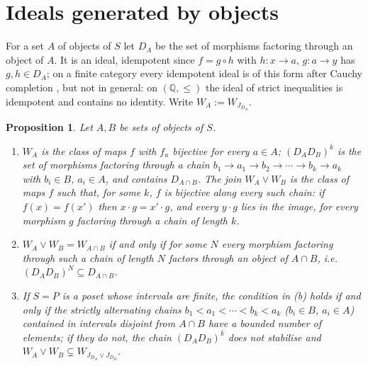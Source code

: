 \documentclass[11pt]{amsart}
\newtheorem{prop}[thm]{Proposition}
\theoremstyle{definition}
\begin{document}
\section{Ideals generated by objects}\label{sec:objects}

For a set $A$ of objects of $S$ let $D_A$ be the set of morphisms factoring
through an object of $A$. It is an ideal, idempotent since $f=g\circ h$ with
$h\colon x\to a$, $g\colon a\to y$ has $g,h\in D_A$; on a finite category
every idempotent ideal is of this form after Cauchy completion
\cite[\S2]{Finitejoin}, but not in general: on $(\mathbb Q,\le)$ the ideal of
strict inequalities is idempotent and contains no identity. Write
$W_A:=W_{J_{D_A}}$.

\begin{prop}\label{prop:objects}
Let $A,B$ be sets of objects of $S$.
\begin{enumerate}
\item[(a)] $W_A$ is the class of maps $f$ with $f_a$ bijective for every
$a\in A$; $(D_AD_B)^k$ is the set of morphisms factoring through a chain
$b_1\to a_1\to b_2\to\cdots\to b_k\to a_k$ with $b_i\in B$, $a_i\in A$, and
contains $D_{A\cap B}$. The join $W_A\vee W_B$ is the class of maps $f$ such
that, for some $k$, $f$ is bijective along every such chain: if $f(x)=f(x')$
then $x\cdot g=x'\cdot g$, and every $y\cdot g$ lies in the image, for every
morphism $g$ factoring through a chain of length $k$.
\item[(b)] $W_A\vee W_B=W_{A\cap B}$ if and only if for some $N$ every
morphism factoring through such a chain of length $N$ factors through an
object of $A\cap B$, i.e.\ $(D_AD_B)^N\subseteq D_{A\cap B}$.
\item[(c)] If $S=P$ is a poset whose intervals are finite, the condition in
(b) holds if and only if the strictly alternating chains
$b_1<a_1<\cdots<b_k<a_k$ ($b_i\in B$, $a_i\in A$) contained in intervals
disjoint from $A\cap B$ have a bounded number of elements; if they do not,
the chain $(D_AD_B)^k$ does not stabilise and $W_A\vee W_B\subsetneq
W_{J_{D_A}\vee J_{D_B}}$.
\end{enumerate}
\end{prop}
\end{document}
